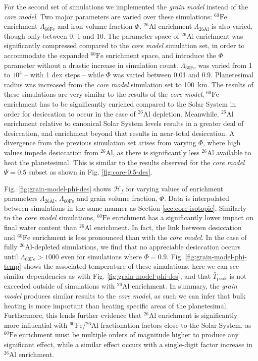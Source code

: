 \documentclass[fleqn,usenatbib]{mnras}
\newcommand{\rms}[1]{\ensuremath{_{\text{#1}}}}
\newcommand{\atom}[2]{$^{#2}\text{#1}$}
\newcommand{\al}{\atom{Al}{26}}
\newcommand{\fe}{\atom{Fe}{60}}
\newcommand{\waterfracHf}{\mathcal{H}_f}
\begin{document}
For the second set of simulations we implemented the \emph{grain model} instead of the \emph{core model}.
Two major parameters are varied over these simulations: \fe{} enrichment $\Lambda\rms{60Fe}$ and iron volume fraction $\Phi$. \al{} enrichment $\Lambda\rms{26Al}$ is also varied, though only between 0, 1 and 10.
The parameter space of \al{} enrichment was significantly compressed compared to the \emph{core model} simulation set, in order to accommodate the expanded \fe{} enrichment space, and introduce the $\Phi$ parameter without a drastic increase in simulation count.
$\Lambda\rms{60Fe}$ was varied from 1 to $10^4$ -- with 1 dex steps -- while $\Phi$ was varied between 0.01 and 0.9.
Planetesimal radius was increased from the \emph{core model} simulation set to \SI{100}{km}.
The results of these simulations are very similar to the results of the \emph{core model}, \fe{} enrichment has to be significantly enriched compared to the Solar System in order for desiccation to occur in the case of \al{} depletion.
Meanwhile, \al{} enrichment relative to canonical Solar System levels results in a greater deal of desiccation, and enrichment beyond that results in near-total desiccation.
A divergence from the previous simulation set arises from varying $\Phi$, where high values impede desiccation from \al{}, as there is significantly less \al{} available to heat the planetesimal.
This is similar to the results observed for the \emph{core model} $\Psi = 0.5$ subset as shown in Fig. \ref{fig:core-0.5-des}.

Fig. \ref{fig:grain-model-phi-des} shows $\waterfracHf$ for varying values of enrichment parameters $\Lambda\rms{26Al}$, $\Lambda\rms{60Fe}$ and grain volume fraction, $\Phi$.
Data is interpolated between simulations in the same manner as Section \ref{sec:core-isotopic}.
Similarly to the \emph{core model} simulations, \fe{} enrichment has a significantly lower impact on final water content than \al{} enrichment.
In fact, the link between desiccation and \fe{} enrichment is less pronounced than with the \emph{core model}.
In the case of fully \al{}-depleted simulations, we find that no appreciable desiccation occurs until $\Lambda\rms{60Fe} > 1000$ even for simulations where $\Phi = 0.9$.
Fig. \ref{fig:grain-model-phi-temp} shows the associated temperature of these simulations, here we can see similar dependencies as with Fig. \ref{fig:grain-model-phi-des}, and that $\bar{T}\rms{peak}$ is not exceeded outside of simulations with \al{} enrichment.
In summary, the \emph{grain model} produces similar results to the \emph{core model}, as such we can infer that bulk heating is more important than heating specific areas of the planetesimal.
Furthermore, this lends further evidence that \al{} enrichment is significantly more influential with \fe{}/\al{} fractionation factors close to the Solar System, as \fe{} enrichment must be multiple orders of magnitude higher to produce any significant effect, while a similar effect occurs with a single-digit factor increase in \al{} enrichment.
\end{document}
